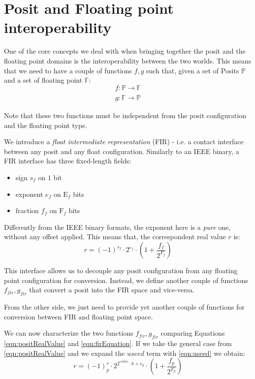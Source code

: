 \section{Posit and Floating point  interoperability}\label{sec:fir}

One of the core concepts we deal with when bringing together the posit and the floating point domains is the interoperability between the two worlds. This means that we need to have a couple of functions $f,g$ such that, given a set of Posits $\mathbb{P}$ and a set of floating point $\mathbb{F}$:
\begin{equation}
    f: \mathbb{P} \xrightarrow[]{} \mathbb{F}
\end{equation}
\begin{equation}
    g: \mathbb{F} \xrightarrow[]{} \mathbb{P}
\end{equation}

Note that these two functions must be independent from the posit configuration  and the floating point type.

We introduce a \textit{float intermediate representation} (FIR) - i.e. a contact interface between any posit and any float configuration. Similarly to an IEEE binary, a FIR interface has three fixed-length fields:
\begin{itemize}
    \item sign $s_f$ on $1$ bit
    \item exponent $e_f$ on $\text{E}_f$ bits
    \item fraction $f_f$ on $\text{F}_f$ bits
\end{itemize}

Differently from the IEEE binary formats, the exponent here is a \textit{pure} one, without any offset applied. This means that, the correspondent real value $r$ is:
\begin{equation}\label{eqn:firEquation}
    r = (-1)^{s_f} \cdot 2^{e_f} \cdot \left(1 + \frac{f_f}{2^{F_f}} \right)
\end{equation}

This interface allows us to decouple any posit configuration from any floating point configuration for conversion. Instead, we define another couple of functions $f_{fir}, 
g_{fir}$ that convert a posit into the FIR space and vice-versa.

From the other side, we just need to provide yet another couple of functions for conversion between FIR and floating point space.

We can now characterize the two functions $f_{fir}, g_{fir}$ comparing Equations \eqref{eqn:positRealValue} and \eqref{eqn:firEquation}. If we take the general case from \eqref{eqn:positRealValue} and we expand the $useed$ term with \eqref{eqn:useed} we obtain:
\begin{equation}\label{eqn:positRealExpanded}
    r = (-1)^s_p \cdot 2^{2^{esbits} \cdot k + e_p} \cdot \left ( 1+ \frac{f_p}{2^{F_p}} \right)
\end{equation}

